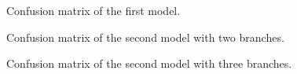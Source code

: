 \documentclass[twocolumn]{article}
\begin{document}
	\begin{figure}[htb]
		\centering
		\caption{Confusion matrix of the first model.}
		\label{fig:model1_conf}
	\end{figure}
	\begin{figure}[ht]
		\centering
		\caption{Confusion matrix of the second model with two branches.}
		\label{fig:model2_1_conf}
	\end{figure}
	\begin{figure}[ht]
		\centering
		\caption{Confusion matrix of the second model with three branches.}
		\label{fig:model2_2_conf}
	\end{figure}
\end{document}
